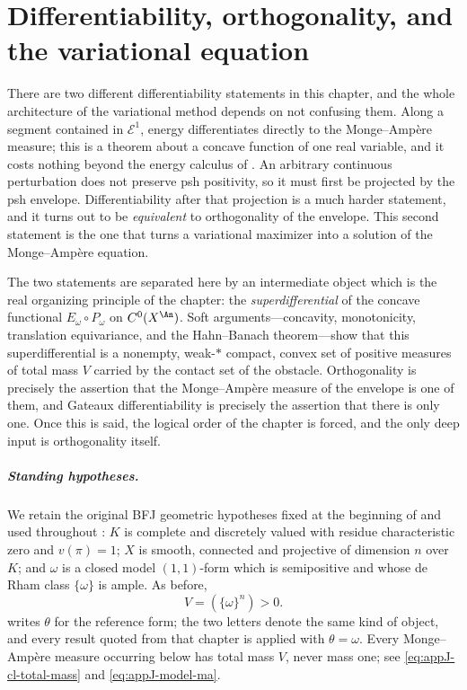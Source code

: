 \chapter{Differentiability, orthogonality, and the variational equation}
\label{chap:bfj-differentiability}

There are two different differentiability statements in this chapter, and the
whole architecture of the variational method depends on not confusing them.
Along a segment contained in \(\mathcal E^1\), energy differentiates directly
to the Monge--Amp\`ere measure; this is a theorem about a concave function of
one real variable, and it costs nothing beyond the energy calculus of
.  An arbitrary continuous perturbation does not
preserve psh positivity, so it must first be projected by the psh envelope.
Differentiability after that projection is a much harder statement, and it
turns out to be \emph{equivalent} to orthogonality of the envelope.  This
second statement is the one that turns a variational maximizer into a
solution of the Monge--Amp\`ere equation.

The two statements are separated here by an intermediate object which is the
real organizing principle of the chapter: the \emph{superdifferential} of the
concave functional \(E_\omega\circ P_\omega\) on \(C^0(X^{\An})\).  Soft
arguments---concavity, monotonicity, translation equivariance, and the
Hahn--Banach theorem---show that this superdifferential is a nonempty,
weak-\(*\) compact, convex set of positive measures of total mass \(V\)
carried by the contact set of the obstacle.  Orthogonality is precisely the
assertion that the Monge--Amp\`ere measure of the envelope is one of them,
and Gateaux differentiability is precisely the assertion that there is only
one.  Once this is said, the logical order of the chapter is forced, and the
only deep input is orthogonality itself.

\paragraph{Standing hypotheses.}
We retain the original BFJ geometric hypotheses fixed at the beginning of
 and used throughout
:
\(K\) is complete and discretely valued with residue characteristic zero and
\(v(\pi)=1\); \(X\) is smooth, connected and projective of dimension \(n\)
over \(K\); and \(\omega\) is a closed model \((1,1)\)-form which is
semipositive and whose de Rham class \(\{\omega\}\) is ample.  As before,
\[
                         V=(\{\omega\}^n)>0 .
\]
 writes \(\theta\) for the reference form; the two
letters denote the same kind of object, and every result quoted from that
chapter is applied with \(\theta=\omega\).  Every Monge--Amp\`ere measure
occurring below has total mass \(V\), never mass one; see
\eqref{eq:appJ-cl-total-mass} and \eqref{eq:appJ-model-ma}.


